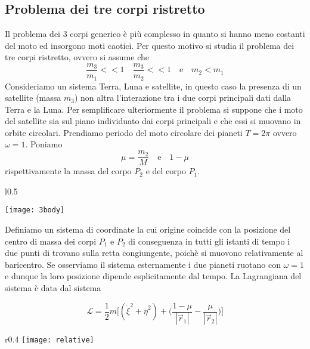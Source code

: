 \subsection{Problema dei tre corpi ristretto}
Il problema dei 3 corpi generico \`{e} pi\`{u} complesso in quanto si hanno meno costanti del moto ed insorgono moti caotici. Per questo motivo si studia il problema dei tre corpi ristretto, ovvero si assume che 
\begin{equation}
	\frac{m_3}{m_1} << 1 \quad \frac{m_3}{m_2} << 1 \quad \text{e} \quad m_2 < m_1
\end{equation}
Consideriamo un sistema Terra, Luna e satellite, in questo caso la presenza di un satellite (massa $m_3$) non altra l'interazione tra i due corpi principali dati dalla Terra e la Luna. Per semplificare ulteriormente il problema si suppone che i moto del satellite sia sul piano individuato dai corpi principali e che essi si muovano in orbite circolari. Prendiamo periodo del moto circolare dei pianeti $T = 2 \pi$ ovvero $\omega = 1$. Poniamo 
\begin{equation*}
	\mu = \frac{m_2}{M} \quad \text{e} \quad 1-\mu
\end{equation*}
rispettivamente la massa del corpo $P_2$ e del corpo $P_1$.\newline
\begin{wrapfigure}{l}{0.5\textwidth}
  \begin{center}
    \texttt{[image: 3body]}
  \end{center}
\end{wrapfigure}
\noindent Definiamo un sistema di coordinate la cui origine coincide con la posizione del centro di massa dei corpi  $P_1$ e $P_2$ di conseguenza in tutti gli istanti di tempo i due punti di trovano sulla retta congiungente, poich\`{e} si muovono relativamente al baricentro. Se osserviamo il sistema esternamente i due pianeti ruotano con $\omega = 1 $ e dunque la loro posizione dipende esplicitamente dal tempo.
La Lagrangiana del sistema \`{e} data dal sistema 

\begin{equation}
	\mathcal{L} = \frac{1}{2}m \Big [(\dot{\xi}^2 +\dot{\eta}^2) + \Big (\frac{1-\mu}{|\vec{r}_1|}- \frac{\mu}{|\vec{r}_2|} \Big ) \Big]
\end{equation}
\begin{wrapfigure}[7]{r}{0.4\textwidth}
    \texttt{[image: relative]}
\end{wrapfigure}

